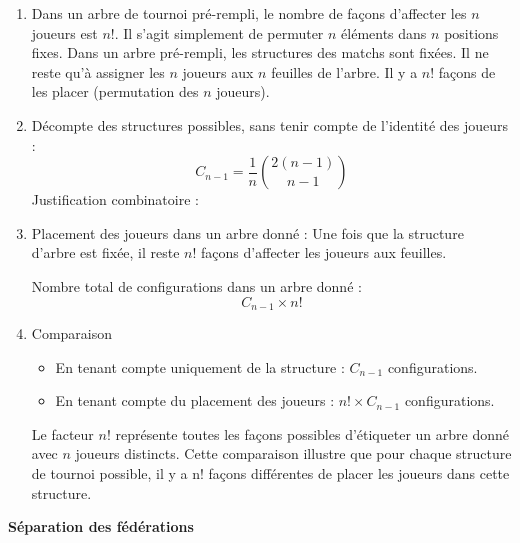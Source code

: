 \documentclass[10pt,a4paper]{article}
\begin{document}
\begin{enumerate}
    \item Dans un arbre de tournoi pré-rempli, le nombre de façons d'affecter les $n$ joueurs est
    $n!$. Il s'agit simplement de permuter $n$ éléments dans $n$ positions fixes.
    Dans un arbre pré-rempli, les structures des matchs sont fixées.
    Il ne reste qu'à assigner les \( n \) joueurs aux \( n \) feuilles de l'arbre.
    Il y a \( n! \) façons de les placer (permutation des \( n \) joueurs).

    \item Décompte des structures possibles, sans tenir compte de l'identité des joueurs :
    $$C_{n-1} = \frac{1}{n} \binom{2(n-1)}{n-1}$$
    Justification combinatoire :

    \item Placement des joueurs dans un arbre donné : Une fois que la structure d'arbre est fixée,
    il reste \( n! \) façons d'affecter les joueurs aux feuilles.

    Nombre total de configurations dans un arbre donné :
    \[
    C_{n-1} \times n!
    \]

    \item Comparaison
     \begin{itemize}
          \item En tenant compte uniquement de la structure : $C_{n-1}$ configurations.
          \item En tenant compte du placement des joueurs : $n! \times C_{n-1}$ configurations.
     \end{itemize}
     Le facteur $n!$ représente toutes les façons possibles d'étiqueter un arbre donné avec $n$ joueurs
     distincts. Cette comparaison illustre que pour chaque structure de tournoi possible, il y a n!
     façons différentes de placer les joueurs dans cette structure.

\end{enumerate}

\q \textbf{Séparation des fédérations}
\end{document}
